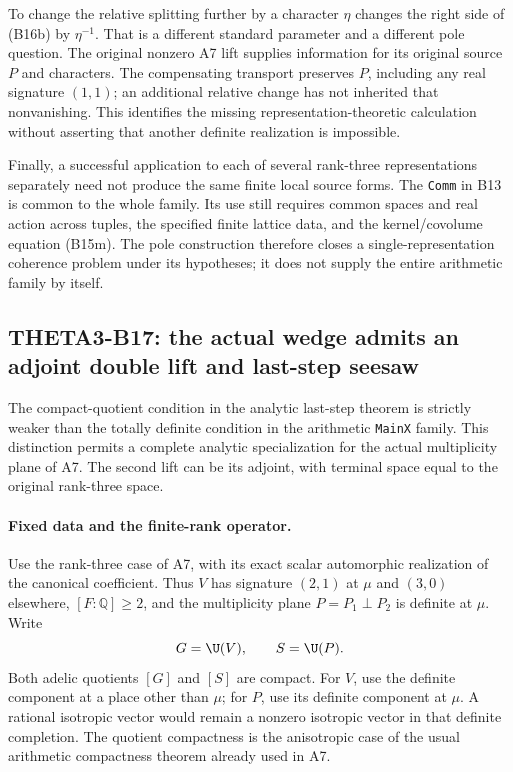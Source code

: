 \documentclass[11pt]{article}
\newcommand{\Q}{\mathbb Q}\newcommand{\C}{\mathbb C}\newcommand{\Z}{\mathbb Z}\newcommand{\R}{\mathbb R}\newcommand{\A}{\mathbb A}\newcommand{\OO}{\mathcal O}
\theoremstyle{definition}\newtheorem{definition}[theorem]{Definition}\newtheorem{remark}[theorem]{Remark}
\begin{document}
To change the relative splitting further by a character $\eta$ changes the right side of (B16b) by $\eta^{-1}$. That is a different standard parameter and a different pole question. The original nonzero A7 lift supplies information for its original source $P$ and characters. The compensating transport preserves $P$, including any real signature $(1,1)$; an additional relative change has not inherited that nonvanishing. This identifies the missing representation-theoretic calculation without asserting that another definite realization is impossible.

Finally, a successful application to each of several rank-three representations separately need not produce the same finite local source forms. The \texttt{Comm} in B13 is common to the whole family. Its use still requires common spaces and real action across tuples, the specified finite lattice data, and the kernel/covolume equation (B15m). The pole construction therefore closes a single-representation coherence problem under its hypotheses; it does not supply the entire arithmetic family by itself.


\subsection{THETA3-B17: the actual wedge admits an adjoint double lift and last-step seesaw}\label{B17}

The compact-quotient condition in the analytic last-step theorem is
strictly weaker than the totally definite condition in the arithmetic
\texttt{MainX} family. This distinction permits a complete analytic
specialization for the actual multiplicity plane of A7. The second
lift can be its adjoint, with terminal space equal to the original
rank-three space.

\paragraph{Fixed data and the finite-rank operator.}
Use the rank-three case of A7, with its exact scalar automorphic
realization of the canonical coefficient. Thus $V$ has signature
$(2,1)$ at $\mu$ and $(3,0)$ elsewhere, $[F:\Q]\geq2$, and the
multiplicity plane $P=P_1\perp P_2$ is definite at $\mu$.
Write
\[
 G=\U(V),\qquad S=\U(P).
\]
Both adelic quotients $[G]$ and $[S]$ are compact. For $V$, use
the definite component at a place other than $\mu$; for $P$, use
its definite component at $\mu$. A rational isotropic vector would
remain a nonzero isotropic vector in that definite completion.
The quotient compactness is the anisotropic case of the usual
arithmetic compactness theorem already used in A7.
\end{document}
